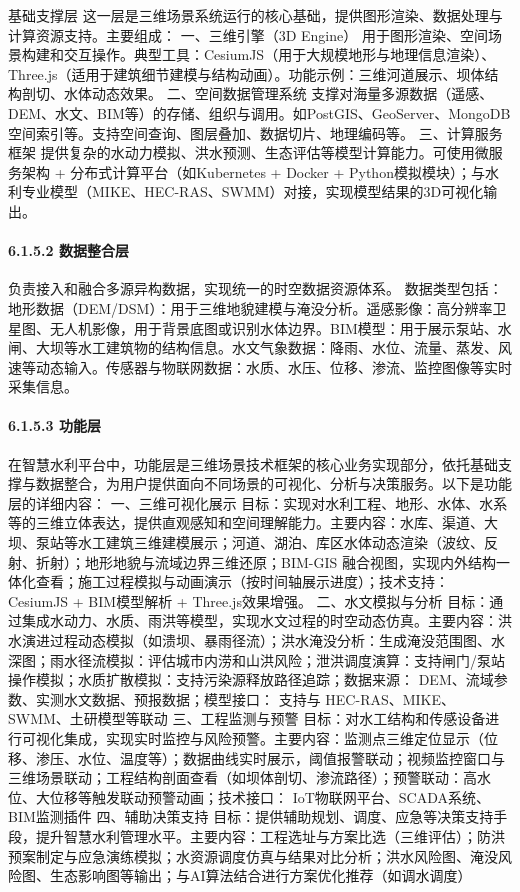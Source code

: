 {{基础支撑层}\label{ux57faux7840ux652fux6491ux5c42} 这一层是三维场景系统运行的核心基础，提供图形渲染、数据处理与计算资源支持。主要组成： 一、三维引擎（3D Engine）
用于图形渲染、空间场景构建和交互操作。典型工具：CesiumJS（用于大规模地形与地理信息渲染）、Three.js（适用于建筑细节建模与结构动画）。功能示例：三维河道展示、坝体结构剖切、水体动态效果。 二、空间数据管理系统
支撑对海量多源数据（遥感、DEM、水文、BIM等）的存储、组织与调用。如PostGIS、GeoServer、MongoDB空间索引等。支持空间查询、图层叠加、数据切片、地理编码等。 三、计算服务框架
提供复杂的水动力模拟、洪水预测、生态评估等模型计算能力。可使用微服务架构 + 分布式计算平台（如Kubernetes + Docker +
Python模拟模块）；与水利专业模型（MIKE、HEC-RAS、SWMM）对接，实现模型结果的3D可视化输出。 \paragraph{6.1.5.2 数据整合层}\label{ux6570ux636eux6574ux5408ux5c42}
负责接入和融合多源异构数据，实现统一的时空数据资源体系。
数据类型包括：地形数据（DEM/DSM）：用于三维地貌建模与淹没分析。遥感影像：高分辨率卫星图、无人机影像，用于背景底图或识别水体边界。BIM模型：用于展示泵站、水闸、大坝等水工建筑物的结构信息。水文气象数据：降雨、水位、流量、蒸发、风速等动态输入。传感器与物联网数据：水质、水压、位移、渗流、监控图像等实时采集信息。
\paragraph{6.1.5.3 功能层}\label{ux529fux80fdux5c42}
在智慧水利平台中，功能层是三维场景技术框架的核心业务实现部分，依托基础支撑与数据整合，为用户提供面向不同场景的可视化、分析与决策服务。以下是功能层的详细内容： 一、三维可视化展示
目标：实现对水利工程、地形、水体、水系等的三维立体表达，提供直观感知和空间理解能力。主要内容：水库、渠道、大坝、泵站等水工建筑三维建模展示；河道、湖泊、库区水体动态渲染（波纹、反射、折射）；地形地貌与流域边界三维还原；BIM-GIS
融合视图，实现内外结构一体化查看；施工过程模拟与动画演示（按时间轴展示进度）；技术支持： CesiumJS + BIM模型解析 + Three.js效果增强。 二、水文模拟与分析
目标：通过集成水动力、水质、雨洪等模型，实现水文过程的时空动态仿真。主要内容：洪水演进过程动态模拟（如溃坝、暴雨径流）；洪水淹没分析：生成淹没范围图、水深图；雨水径流模拟：评估城市内涝和山洪风险；泄洪调度演算：支持闸门/泵站操作模拟；水质扩散模拟：支持污染源释放路径追踪；数据来源：
DEM、流域参数、实测水文数据、预报数据；模型接口： 支持与 HEC-RAS、MIKE、SWMM、土研模型等联动 三、工程监测与预警
目标：对水工结构和传感设备进行可视化集成，实现实时监控与风险预警。主要内容：监测点三维定位显示（位移、渗压、水位、温度等）；数据曲线实时展示，阈值报警联动；视频监控窗口与三维场景联动；工程结构剖面查看（如坝体剖切、渗流路径）；预警联动：高水位、大位移等触发联动预警动画；技术接口：
IoT物联网平台、SCADA系统、BIM监测插件 四、辅助决策支持
目标：提供辅助规划、调度、应急等决策支持手段，提升智慧水利管理水平。主要内容：工程选址与方案比选（三维评估）；防洪预案制定与应急演练模拟；水资源调度仿真与结果对比分析；洪水风险图、淹没风险图、生态影响图等输出；与AI算法结合进行方案优化推荐（如调水调度）
}
